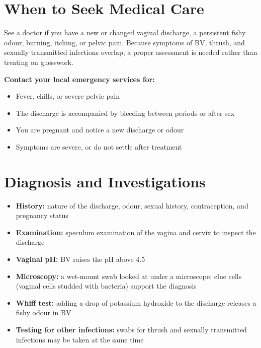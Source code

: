 \section*{When to Seek Medical Care}
See a doctor if you have a new or changed vaginal discharge, a persistent fishy odour, burning, itching, or pelvic pain. Because symptoms of BV, thrush, and sexually transmitted infections overlap, a proper assessment is needed rather than treating on guesswork.

\textbf{Contact your local emergency services for:}
\begin{itemize}
    \item Fever, chills, or severe pelvic pain
    \item The discharge is accompanied by bleeding between periods or after sex
    \item You are pregnant and notice a new discharge or odour
    \item Symptoms are severe, or do not settle after treatment
\end{itemize}

\section*{Diagnosis and Investigations}
\begin{itemize}
    \item \textbf{History:} nature of the discharge, odour, sexual history, contraception, and pregnancy status
    \item \textbf{Examination:} speculum examination of the vagina and cervix to inspect the discharge
    \item \textbf{Vaginal pH:} BV raises the pH above 4.5
    \item \textbf{Microscopy:} a wet-mount swab looked at under a microscope; clue cells (vaginal cells studded with bacteria) support the diagnosis
    \item \textbf{Whiff test:} adding a drop of potassium hydroxide to the discharge releases a fishy odour in BV
    \item \textbf{Testing for other infections:} swabs for thrush and sexually transmitted infections may be taken at the same time
\end{itemize}

